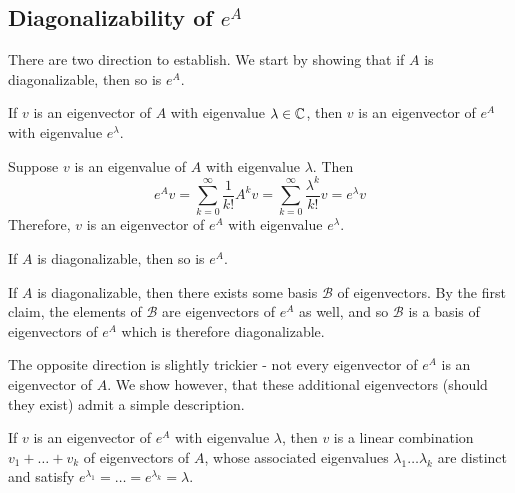 \documentclass{scrartcl}
\begin{document}
\subsection{Diagonalizability of $e^A$}
\begin{solution} There are two direction to establish. We start by showing that if $A$ is diagonalizable, then so is $e^A$.
    \begin{claimbox}
    If $v$ is an eigenvector of $A$ with eigenvalue $\lambda\in \mathbb C$, then $v$ is an eigenvector of $e^A$ with eigenvalue $e^\lambda$.
    \end{claimbox}
    \begin{tproof}
    Suppose $v$ is an eigenvalue of $A$ with eigenvalue $\lambda$. Then 
    \[e^Av=\sum_{k=0}^{\infty}\frac{1}{k!}A^kv=\sum_{k=0}^{\infty}\frac{\lambda^k}{k!}v=e^\lambda v\]
    Therefore, $v$ is an eigenvector of $e^A$
     with eigenvalue $e^\lambda$.
     \end{tproof}
    
    \begin{claimbox}
    If $A$ is diagonalizable, then so is $e^A$.
    \end{claimbox}
    \begin{tproof}
    If $A$ is diagonalizable, then there exists some basis $\mathcal{B}$ of eigenvectors. By the first claim, the elements of $\mathcal{B}$ are eigenvectors of $e^A$ as well, and so $\mathcal{B}$ is a basis of eigenvectors of $e^A$ which is therefore diagonalizable.
    \end{tproof}
    
    The opposite direction is slightly trickier - not every eigenvector of $e^A$ is an eigenvector of $A$. We show however, that these additional eigenvectors (should they exist) admit a simple description. 
    
    \begin{claimbox}
    If $v$ is an eigenvector of $e^A$ with eigenvalue $\lambda$, then $v$ is a linear combination $v_1+\dots +v_k$ of eigenvectors of $A$, whose associated eigenvalues $\lambda_1\dots \lambda_k$ are distinct and satisfy $e^{\lambda_1}=\dots=e^{\lambda_k}=\lambda$.
    \end{claimbox}
        

\end{solution}
\end{document}
